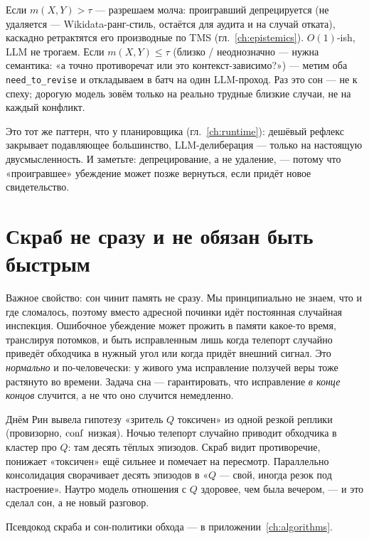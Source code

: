\begin{principle}
Если $m(X,Y) > \tau$ --- разрешаем молча: проигравший депрецируется
(не удаляется --- Wikidata-ранг-стиль, остаётся для аудита и на случай
отката), каскадно ретрактятся его производные по TMS
(гл.~\ref{ch:epistemics}). $O(1)$-ish, LLM не трогаем. Если
$m(X,Y) \le \tau$ (близко / неоднозначно --- нужна семантика: «а точно
противоречат или это контекст-зависимо?») --- метим оба
\texttt{need\_to\_revise} и откладываем в батч на один LLM-проход. Раз это сон
--- не к спеху; дорогую модель зовём только на реально трудные близкие случаи,
не на каждый конфликт.
\end{principle}

Это тот же паттерн, что у планировщика (гл.~\ref{ch:runtime}): дешёвый рефлекс
закрывает подавляющее большинство, LLM-делиберация --- только на настоящую
двусмысленность. И заметьте: депрецирование, а не удаление, --- потому что
«проигравшее» убеждение может позже вернуться, если придёт новое
свидетельство.

\section{Скраб не сразу и не обязан быть быстрым}

Важное свойство: сон чинит память не сразу. Мы принципиально не знаем, что и
где сломалось, поэтому вместо адресной починки идёт постоянная случайная
инспекция. Ошибочное убеждение может прожить в памяти какое-то время,
транслируя потомков, и быть исправленным лишь когда телепорт случайно
приведёт обходчика в нужный угол или когда придёт внешний сигнал. Это
\emph{нормально} и по-человечески: у живого ума исправление ползучей веры
тоже растянуто во времени. Задача сна --- гарантировать, что исправление
\emph{в конце концов} случится, а не что оно случится немедленно.

\begin{workedbox}
Днём Рин вывела гипотезу «зритель $Q$ токсичен» из одной резкой реплики
(провизорно, $\mathrm{conf}$ низкая). Ночью телепорт случайно приводит обходчика в
кластер про $Q$: там десять тёплых эпизодов. Скраб видит противоречие,
понижает «токсичен» ещё сильнее и помечает на пересмотр. Параллельно
консолидация сворачивает десять эпизодов в «$Q$ --- свой, иногда резок под
настроение». Наутро модель отношения с $Q$ здоровее, чем была вечером, --- и
это сделал сон, а не новый разговор.
\end{workedbox}

Псевдокод скраба и сон-политики обхода --- в приложении~\ref{ch:algorithms}.
